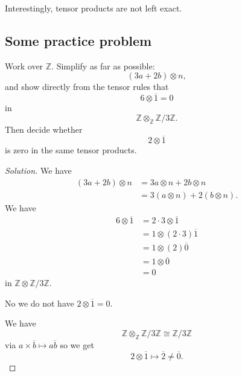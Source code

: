 \documentclass[11pt]{article}
\begin{document}
Interestingly, tensor products are not left exact. 

\subsection{Some practice problem}

\begin{prob}
    Work over $\mathbb Z$. Simplify as 
    far as possible: 
    \[
        (3a + 2b) \otimes n, 
    \]
    and show directly from 
    the tensor rules that 
    \[
        6 \otimes \overline 1 = 0
    \]
    in 
    \[
        \mathbb Z \otimes_{\mathbb Z} \mathbb Z/3\mathbb Z. 
    \]
    Then decide whether 
    \[
        2 \otimes \overline 1 
    \]
    is zero in the same tensor products. 
\end{prob}
\begin{proof}[Solution]
    We have 
    \begin{align*}
        (3a + 2b) \otimes n 
        &= 3a \otimes n + 2b \otimes n \\ 
        &= 3(a \otimes n) + 2(b\otimes n).  
    \end{align*}
    We have 
    \begin{align*}
        6 \otimes \overline 1 
        &= 2 \cdot 3 \otimes \overline 1 \\ 
        &= 1 \otimes (2 \cdot 3) \overline 1 \\ 
        &= 1 \otimes (2) \overline 0 \\ 
        &= 1 \otimes \overline 0 \\ 
        &= 0
    \end{align*}
    in $\mathbb Z \otimes \mathbb Z/3\mathbb Z$. 

    No we do not have $2\otimes \overline 1 = 0$. 

    We have 
    \[
        \mathbb Z \otimes_{\mathbb Z} 
        \mathbb Z/3\mathbb Z 
        \cong \mathbb Z/3\mathbb Z 
    \]
    via $a\times \overline b \mapsto a \overline b$ 
    so we get 
    \[
        2 \otimes \overline 1 
        \mapsto \overline 2 \neq \overline 0. 
    \]
\end{proof}
\end{document}
